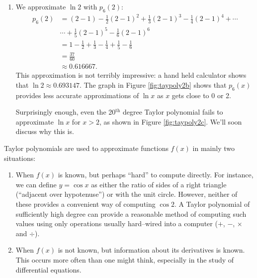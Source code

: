 {\begin{enumerate}
\begin{align*}
p_6(1.5) &= (1.5-1)-\frac12(1.5-1)^2+\frac13(1.5-1)^3-\frac14(1.5-1)^4+\cdots \\
			&\cdots +\frac15(1.5-1)^5-\frac16(1.5-1)^6\\
	&=\frac{259}{640}\\
	&\approx 0.404688.
\end{align*}
\normalsize
This is a good approximation as a calculator shows that $\ln 1.5 \approx 0.4055.$ Figure \ref{fig:taypoly2b} plots $y=\ln x$ with $y=p_6(x)$. We can see that $\ln 1.5\approx p_6(1.5)$.

\item	
We approximate $\ln 2$ with $ p_6(2)$:
\begin{align*}
p_6(2) &= (2-1)-\frac12(2-1)^2+\frac13(2-1)^3-\frac14(2-1)^4+\cdots \\
			&\cdots +\frac15(2-1)^5-\frac16(2-1)^6\\
			&=	1-\frac12+\frac13-\frac14+\frac15-\frac16 \\
			&= \frac{37}{60}\\ 
			&\approx 0.616667.
\end{align*}
This approximation is not terribly impressive: a hand held calculator shows that $\ln 2 \approx 0.693147.$ The graph in Figure \ref{fig:taypoly2b} shows that $p_6(x)$ provides less accurate approximations of $\ln x$ as $x$ gets close to 0 or 2. 

Surprisingly enough, even the 20$^\text{th}$ degree Taylor polynomial fails to approximate $\ln x$ for $x>2$, as shown in Figure \ref{fig:taypoly2c}. We'll soon discuss why this is.
\end{enumerate}}

Taylor polynomials are used to approximate functions $f(x)$ in mainly two situations:
	\begin{enumerate}
	\item		When $f(x)$ is known, but perhaps ``hard'' to compute directly. For instance, we can define $y=\cos x$ as either the ratio of sides of a right triangle (``adjacent over hypotenuse'') or with the unit circle. However, neither of these provides a convenient way of computing $\cos 2$. A Taylor polynomial of sufficiently high degree can provide a reasonable method of computing such values using only operations usually hard--wired into a computer ($+$, $-$, $\times$ and $\div$).
	
	\item		When $f(x)$ is not known, but information about its derivatives is known. This occurs more often than one might think, especially in the study of differential equations.
	\end{enumerate}

